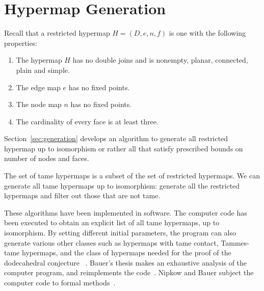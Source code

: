 \section{Hypermap Generation}\label{sec:hyper-gener}

Recall that a restricted hypermap  $H = (D,e,n,f)$ is one with the following 
properties:
\begin{enumerate}
\item The hypermap $H$ has no double joins and is nonempty, planar,
  connected, plain and simple.
\item The edge map $e$ has no fixed points.  %
\item The node map $n$ has no fixed points.
\item The cardinality of every face is at least three.
\end{enumerate}

Section~\ref{sec:generation} develops an algorithm to generate all
restricted hypermap up to isomorphism or rather all that satisfy
prescribed bounds on number of nodes and faces.

The set of tame hypermaps is a subset of the set of
restricted hypermaps.  We can generate
all tame hypermaps up to isomorphism: generate all the restricted
hypermaps and filter out those that are not tame.

These algorithms have been implemented in software.  The computer code
has been executed to obtain an explicit list of all tame hypermaps, up
to isomorphism.  By setting different initial parameters, the program
can also generate various other classes such as hypermaps with tame
contact, Tammes-tame hypermaps, and the class of hypermaps needed for
the proof of the dodecahedral conjecture
~\cite{Hales:2010:Dodec}. %
Bauer's thesis makes an exhaustive analysis of the computer
program, and reimplements the code~\cite{Bauer:2006:Thesis}.  Nipkow and
Bauer subject the computer code to formal methods~\cite{Nipkow:2005:Tame}.



